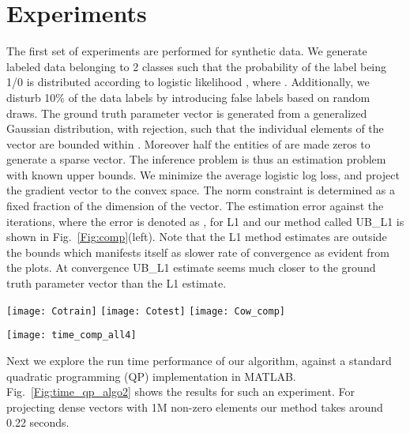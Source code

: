 \documentclass{article}
\begin{document}
\section{Experiments}\label{SEC:Expts}
The first set of experiments are performed for synthetic data. We generate labeled data belonging to 2 classes such that the probability of the label being 1/0 is distributed according to logistic likelihood ,
where . Additionally, we disturb 10\% of the data labels by introducing false labels based on random draws.
The ground truth parameter vector  is generated from a generalized Gaussian distribution, with rejection, such that the individual elements of the vector are bounded within . Moreover half the entities of  are made zeros to generate a sparse vector. The inference problem is thus an estimation problem with known upper bounds. We minimize the average logistic log loss, and project the gradient vector to the convex space. The norm constraint is determined as a fixed fraction of the dimension of the vector. The estimation error against the iterations, where the error is denoted as , for L1 and our method called UB\_L1 is shown in Fig.~\ref{Fig:comp}(left). Note that the L1 method estimates are outside the bounds which manifests itself as slower rate of convergence as evident from the plots. At convergence UB\_L1 estimate seems much closer to the ground truth parameter vector than the L1 estimate.
\begin{figure*}[htbp!]
\centering
  \texttt{[image: Cotrain]}
  \texttt{[image: Cotest]}
  \texttt{[image: Cow\_comp]}
\caption{Top left: plot for abs vs. iteration (training). Top right: similar plot for testing. Bottom: estimated parameter vector . For all panels, blue: L1, red: our method UB\_L1 and green: ground truth. \label{Fig:comp}
}
\end{figure*}

\begin{figure*}[htbp!]
\centering
\texttt{[image: time\_comp\_all4]}
\caption{Left: comparison of our method against Matlab QP. Blue: run time (in seconds) for QP implementation of MATLAB. Red: run time for our linear time method. The horizontal axis runs over the dimension of the input vector . Right: zoomed in red curve. \label{Fig:time_qp_algo2}
}
\end{figure*}
Next we explore the run time performance of our algorithm, against a standard quadratic programming (QP) implementation in MATLAB. Fig.~\ref{Fig:time_qp_algo2} shows the results for such an experiment. For projecting dense vectors with 1M non-zero
elements our method takes around 0.22 seconds.
\end{document}
